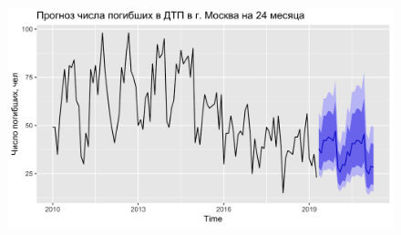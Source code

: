 \documentclass[14pt, a4paper]{extarticle}\usepackage[]{graphicx}\usepackage[]{color}
\makeatletter
\def\maxwidth{ %
  \ifdim\Gin@nat@width>\linewidth
    \linewidth
  \else
    \Gin@nat@width
  \fi
}
\newenvironment{knitrout}{}{} %
\makeatother
\begin{document}
\begin{figure}[H]
\begin{knitrout}
\color{fgcolor}

{\centering \includegraphics[width=\maxwidth]{figure/unnamed-chunk-29-1} 

}



\end{knitrout}
\end{figure}
\end{document}
